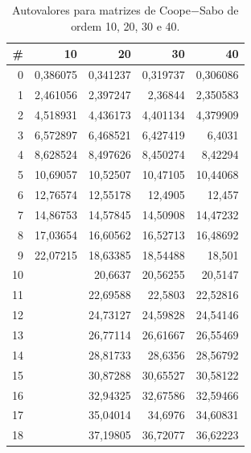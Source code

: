 	
\begin{table}[pt]
	\caption{Autovalores para matrizes de Coope$-$Sabo de ordem 10, 20, 30 e 40.}
	\label{tab:autovalores10a40}
\begin{center}
\begin{tabular}{r|r|r|r|r}
	\hline \hline
		 \textbf{\#} &   \textbf{10} &   \textbf{20} &   \textbf{30} &   \textbf{40} \\
	\hline \hline
					 0 &   0,386075 &   0,341237 &   0,319737 &   0,306086 \\
	\hline
					 1 &   2,461056 &   2,397247 &    2,36844 &   2,350583 \\
	\hline
					 2 &   4,518931 &   4,436173 &   4,401134 &   4,379909 \\
	\hline
					 3 &   6,572897 &   6,468521 &   6,427419 &     6,4031 \\
	\hline
					 4 &   8,628524 &   8,497626 &   8,450274 &    8,42294 \\
	\hline
					 5 &   10,69057 &   10,52507 &   10,47105 &   10,44068 \\
	\hline
					 6 &   12,76574 &   12,55178 &    12,4905 &     12,457 \\
	\hline
					 7 &   14,86753 &   14,57845 &   14,50908 &   14,47232 \\
	\hline
					 8 &   17,03654 &   16,60562 &   16,52713 &   16,48692 \\
	\hline
					9 &   22,07215 &   18,63385 &   18,54488 &     18,501 \\
	\hline
					10 &            &    20,6637 &   20,56255 &    20,5147 \\
	\hline
					11 &            &   22,69588 &    22,5803 &   22,52816 \\
	\hline
					12 &            &   24,73127 &   24,59828 &   24,54146 \\
	\hline
					13 &            &   26,77114 &   26,61667 &   26,55469 \\
	\hline
					14 &            &   28,81733 &    28,6356 &   28,56792 \\
	\hline
					15 &            &   30,87288 &   30,65527 &   30,58122 \\
	\hline
					16 &            &   32,94325 &   32,67586 &   32,59466 \\
	\hline
					17 &            &   35,04014 &    34,6976 &   34,60831 \\
	\hline
					18 &            &   37,19805 &   36,72077 &   36,62223 \\
	\hline

\end{tabular}
\end{center}
\end{table}
